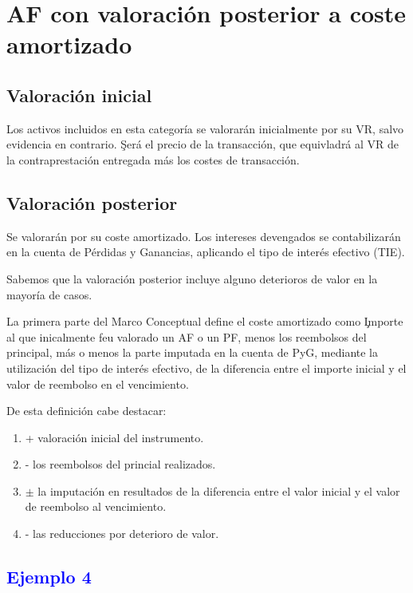 \section{AF con valoración posterior a coste amortizado}

\subsection{Valoración inicial}

Los activos incluidos en esta categoría se valorarán inicialmente por su VR, salvo evidencia en contrario. \c{Será el precio de la transacción, que equivladrá al VR de la contraprestación entregada más los costes de transacción.}

\subsection{Valoración posterior}

Se valorarán por su coste amortizado. Los intereses devengados se contabilizarán en la cuenta de Pérdidas y Ganancias, aplicando el tipo de interés efectivo (TIE).

Sabemos que la valoración posterior incluye alguno deterioros de valor en la mayoría de casos.

La primera parte del Marco Conceptual define el coste amortizado como \c{Importe al que inicalmente feu valorado un AF o un PF, menos los reembolsos del principal, más o menos la parte imputada en la cuenta de PyG, mediante la utilización del tipo de interés efectivo, de la diferencia entre el importe inicial y el valor de reembolso en el vencimiento.}

De esta definición cabe destacar:
\begin{enumerate}
    \item + valoración inicial del instrumento.
    \item - los reembolsos del princial realizados.
    \item $\pm$ la imputación en resultados de la diferencia entre el valor inicial y el valor de reembolso al vencimiento.
    \item - las reducciones por deterioro de valor.
\end{enumerate}

\subsection*{\textcolor{blue}{Ejemplo 4}}

